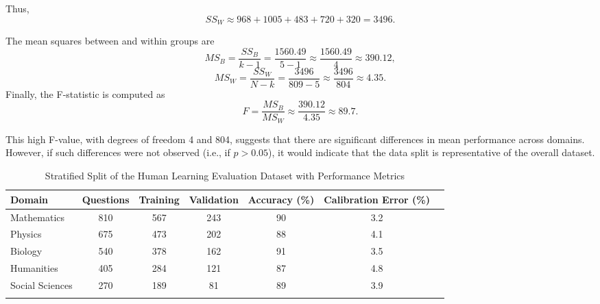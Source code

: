 \documentclass{svproc}
\begin{document}
Thus,
\begin{equation}
  SS_W \approx 968 + 1005 + 483 + 720 + 320 = 3496.
\end{equation}

The mean squares between and within groups are
\begin{equation}
  MS_B = \frac{SS_B}{k-1} = \frac{1560.49}{5-1} \approx \frac{1560.49}{4} \approx 390.12,
\end{equation}
\begin{equation}
  MS_W = \frac{SS_W}{N-k} = \frac{3496}{809-5} \approx \frac{3496}{804} \approx 4.35.
\end{equation}
Finally, the F-statistic is computed as
\begin{equation}
  F = \frac{MS_B}{MS_W} \approx \frac{390.12}{4.35} \approx 89.7.
\end{equation}

This high F-value, with degrees of freedom 4 and 804, suggests that there are significant differences in mean performance across domains. However, if such differences were not observed (i.e., if \(p > 0.05\)), it would indicate that the data split is representative of the overall dataset.

\begin{table}[h]
    \centering
    \begin{tabular}{lcccccc}
    \toprule
    Domain          & Questions & Training & Validation  & Accuracy (\%) & Calibration Error (\%) \\
    \midrule
    Mathematics     & 810             & 567             & 243             & 90            & 3.2                    \\
    Physics         & 675             & 473             & 202             & 88            & 4.1                    \\
    Biology         & 540             & 378             & 162             & 91            & 3.5                    \\
    Humanities      & 405             & 284             & 121             & 87            & 4.8                    \\
    Social Sciences & 270             & 189             & 81              & 89            & 3.9                    \\
    \bottomrule
    \\
    \end{tabular}
    \caption{Stratified Split of the Human Learning Evaluation Dataset with Performance Metrics}
    \label{tab:split-results}
\end{table}
\end{document}
